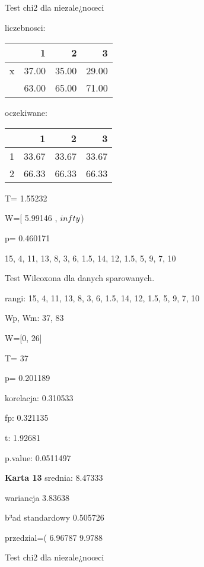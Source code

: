 \documentclass[a4paper,12pt]{article}
\begin{document}
\begin{multicols}{3}
  Test chi2 dla niezale¿noœci 
   
   liczebnosci: %
\begin{tabular}{rrrr}
  \hline
 & 1 & 2 & 3 \\
  \hline
x & 37.00 & 35.00 & 29.00 \\
   & 63.00 & 65.00 & 71.00 \\
   \hline
\end{tabular}
 
   
   oczekiwane: %
\begin{tabular}{rrrr}
  \hline
 & 1 & 2 & 3 \\
  \hline
1 & 33.67 & 33.67 & 33.67 \\
  2 & 66.33 & 66.33 & 66.33 \\
   \hline
\end{tabular}
 
   
   T= 1.55232 
   
   W=[ 5.99146 , $\\infty$) 
   
   p= 0.460171 \vspace{1cm} 

  15, 4, 11, 13, 8, 3, 6, 1.5, 14, 12, 1.5, 5, 9, 7, 10 

  Test Wilcoxona dla danych sparowanych. 
  
  rangi: 15, 4, 11, 13, 8, 3, 6, 1.5, 14, 12, 1.5, 5, 9, 7, 10 
  
  Wp, Wm:  37,  83 
  
  W=[0, 26]  
  
  T=  37 
  
  p= 0.201189 \vspace{1cm} 

  korelacja: 0.310533
     
     fp: 0.321135
     
     t: 1.92681
     
     p.value: 0.0511497 \vspace{1cm} 

  \textbf{Karta  13 } 
 srednia: 8.47333 
     
     wariancja 3.83638  
     
     b³ad standardowy 0.505726 
     
     przedzial=( 6.96787 9.9788 \vspace{1cm} 

  Test chi2 dla niezale¿noœci 
   

\end{multicols}
\end{document}
